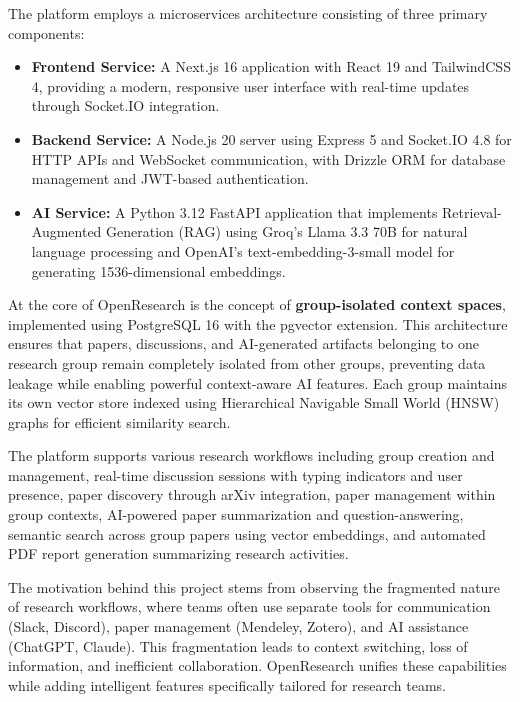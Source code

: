 \documentclass[12pt]{report}
\begin{document}
The platform employs a microservices architecture consisting of three primary components:

\begin{itemize}
    \item \textbf{Frontend Service:} A Next.js 16 application with React 19 and TailwindCSS 4, providing a modern, responsive user interface with real-time updates through Socket.IO integration.
    
    \item \textbf{Backend Service:} A Node.js 20 server using Express 5 and Socket.IO 4.8 for HTTP APIs and WebSocket communication, with Drizzle ORM for database management and JWT-based authentication.
    
    \item \textbf{AI Service:} A Python 3.12 FastAPI application that implements Retrieval-Augmented Generation (RAG) using Groq's Llama 3.3 70B for natural language processing and OpenAI's text-embedding-3-small model for generating 1536-dimensional embeddings.
\end{itemize}

At the core of OpenResearch is the concept of \textbf{group-isolated context spaces}, implemented using PostgreSQL 16 with the pgvector extension. This architecture ensures that papers, discussions, and AI-generated artifacts belonging to one research group remain completely isolated from other groups, preventing data leakage while enabling powerful context-aware AI features. Each group maintains its own vector store indexed using Hierarchical Navigable Small World (HNSW) graphs for efficient similarity search.

The platform supports various research workflows including group creation and management, real-time discussion sessions with typing indicators and user presence, paper discovery through arXiv integration, paper management within group contexts, AI-powered paper summarization and question-answering, semantic search across group papers using vector embeddings, and automated PDF report generation summarizing research activities.

The motivation behind this project stems from observing the fragmented nature of research workflows, where teams often use separate tools for communication (Slack, Discord), paper management (Mendeley, Zotero), and AI assistance (ChatGPT, Claude). This fragmentation leads to context switching, loss of information, and inefficient collaboration. OpenResearch unifies these capabilities while adding intelligent features specifically tailored for research teams.
\end{document}
